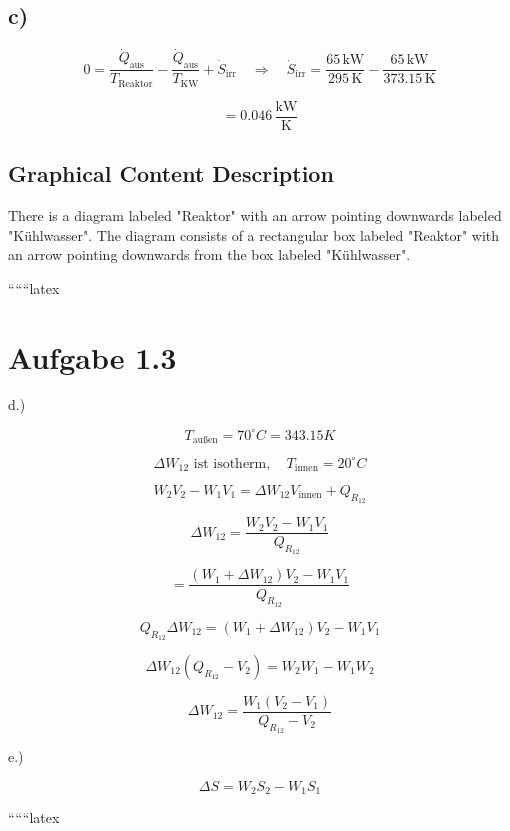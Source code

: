 

\subsection*{c)}

\[
0 = \frac{\dot{Q}_{\text{aus}}}{T_{\text{Reaktor}}} - \frac{\dot{Q}_{\text{aus}}}{T_{\text{KW}}} + \dot{S}_{\text{irr}} \quad \Rightarrow \quad \dot{S}_{\text{irr}} = \frac{65 \, \text{kW}}{295 \, \text{K}} - \frac{65 \, \text{kW}}{373.15 \, \text{K}}
\]

\[
= 0.046 \, \frac{\text{kW}}{\text{K}}
\]

\subsection*{Graphical Content Description}

There is a diagram labeled "Reaktor" with an arrow pointing downwards labeled "Kühlwasser". The diagram consists of a rectangular box labeled "Reaktor" with an arrow pointing downwards from the box labeled "Kühlwasser".

``````latex

\section*{Aufgabe 1.3}

d.)

\[
T_{\text{außen}} = 70^\circ C = 343.15 K
\]

\[
\Delta W_{12} \text{ ist } \text{isotherm}, \quad T_{\text{innen}} = 20^\circ C
\]

\[
W_2 V_2 - W_1 V_1 = \Delta W_{12} V_{\text{innen}} + Q_{R_{12}}
\]

\[
\Delta W_{12} = \frac{W_2 V_2 - W_1 V_1}{Q_{R_{12}}}
\]

\[
= \frac{(W_1 + \Delta W_{12}) V_2 - W_1 V_1}{Q_{R_{12}}}
\]

\[
Q_{R_{12}} \Delta W_{12} = (W_1 + \Delta W_{12}) V_2 - W_1 V_1
\]

\[
\Delta W_{12} (Q_{R_{12}} - V_2) = W_2 W_1 - W_1 W_2
\]

\[
\Delta W_{12} = \frac{W_1 (V_2 - V_1)}{Q_{R_{12}} - V_2}
\]

e.)

\[
\Delta S = W_2 S_2 - W_1 S_1
\]

``````latex